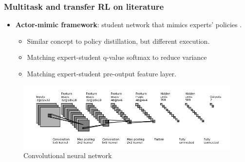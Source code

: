 \documentclass{beamer}
\theoremstyle{remark}
\theoremstyle{plain}
\begin{document}
\begin{frame}
  \frametitle{Multitask and transfer RL on literature}
\begin{itemize}
    \item \textbf{Actor-mimic framework}: student network that mimics experts' policies \cite{Parisotto2015Actor-Mimic:Learning}.
    \begin{itemize}
        \item Similar concept to policy distillation, but different execution.
        \item Matching expert-student q-value softmax to reduce variance
        \item Matching expert-student pre-output feature layer.
    \end{itemize} 
\end{itemize}
\begin{figure}
    \centering
    \includegraphics[scale=0.6]{figs/neural.png}
    \caption{Convolutional neural network}
    \label{fig:my_label}
\end{figure}
 \end{frame}
 
\end{document}
